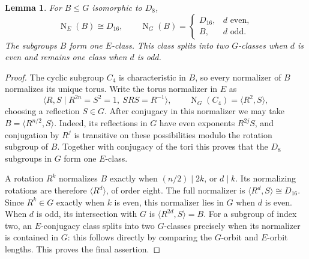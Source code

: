 \documentclass[11pt]{article}
\newtheorem{lemma}{Lemma}
\newcommand{\N}{\operatorname{N}}
\begin{document}
\begin{lemma}\label{normalizer}
For $B\le G$ isomorphic to $D_8$,
\[
 \N_E(B)\cong D_{16},\qquad
 \N_G(B)=
 \begin{cases}D_{16},&d\text{ even},\\ B,&d\text{ odd}.
 \end{cases}
\]
The subgroups $B$ form one $E$-class. This class splits into two
$G$-classes when $d$ is even and remains one class when $d$ is odd.
\end{lemma}
\begin{proof}
The cyclic subgroup $C_4$ is characteristic in $B$, so every normalizer
of $B$ normalizes its unique torus. Write the torus normalizer in $E$
as
\[
 \langle R,S\mid R^{2n}=S^2=1,\ SRS=R^{-1}\rangle,
 \qquad \N_G(C_4)=\langle R^2,S\rangle,
\]
choosing a reflection $S\in G$. After conjugacy in this normalizer
we may take $B=\langle R^{n/2},S\rangle$. Indeed, its reflections
in $G$ have even exponents $R^{2j}S$, and conjugation by $R^j$
is transitive on these possibilities modulo the rotation subgroup of
$B$. Together with conjugacy of the tori this proves that the $D_8$
subgroups in $G$ form one $E$-class.

A rotation $R^k$ normalizes $B$ exactly when $(n/2)\mid2k$, or
$d\mid k$. Its normalizing rotations are therefore
$\langle R^d\rangle$, of order eight. The full normalizer is
$\langle R^d,S\rangle\cong D_{16}$. Since $R^k\in G$ exactly
when $k$ is even, this normalizer lies in $G$ when $d$ is even.
When $d$ is odd, its intersection with $G$ is
$\langle R^{2d},S\rangle=B$. For a subgroup of index two, an
$E$-conjugacy class splits into two $G$-classes precisely when its
normalizer is contained in $G$: this follows directly by comparing
the $G$-orbit and $E$-orbit lengths. This proves the final assertion.
\end{proof}
\end{document}
